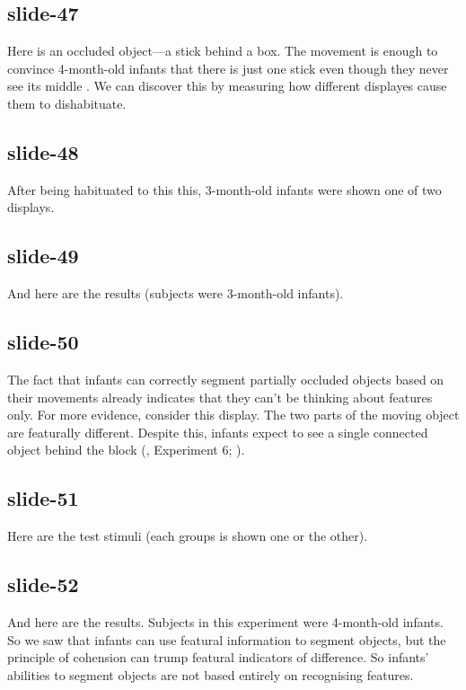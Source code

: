 \documentclass[12pt,\papersize]{extarticle}
\begin{document}
 
\subsection{slide-47}
Here is an occluded object---a stick behind a box.
The movement is enough to convince 4-month-old infants that there is just one stick even though they never see its middle \citep{kellman:1983_perception}. We can discover this by measuring how different displayes cause them to dishabituate.
 
 
\subsection{slide-48}
After being habituated to this this, 3-month-old infants were shown one of two displays.
 
 
\subsection{slide-49}
And here are the results (subjects were 3-month-old infants).
 
 
\subsection{slide-50}
The fact that infants can correctly segment partially occluded objects based on their movements already indicates that they can't be thinking about features only.
For more evidence, consider this display.
The two parts of the moving object are featurally different.
Despite this, infants expect to see a single connected object behind the block (\citealp{kellman:1983_perception}, Experiment 6; \citealp{Spelke:1990jn}).
 
 
\subsection{slide-51}
Here are the test stimuli (each groups is shown one or the other).
 
 
\subsection{slide-52}
And here are the results.
Subjects in this experiment were 4-month-old infants.
So we saw that infants can use featural information to segment objects, but the principle of cohension can trump featural indicators of difference.
So infants' abilities to segment objects are not based entirely on recognising features.
 
\end{document}
